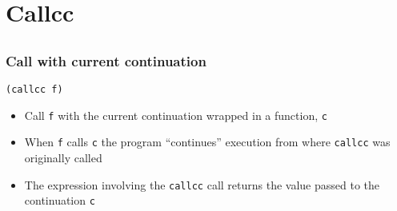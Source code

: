 \documentclass{beamer}
\begin{document}
\section{Callcc}
\subsection{} 
\begin{frame}[fragile]
\frametitle{Call with current continuation}

\begin{lstlisting}
(callcc f)
\end{lstlisting}

\begin{itemize}
\item Call \texttt{f} with the current continuation wrapped in a
  function, \texttt{c}
\item When \texttt{f} calls \texttt{c} the program ``continues''
  execution from where \texttt{callcc} was originally called
\item The expression involving the \texttt{callcc} call returns the
  value passed to the continuation \texttt{c}
\end{itemize}





\end{frame}
\end{document}
